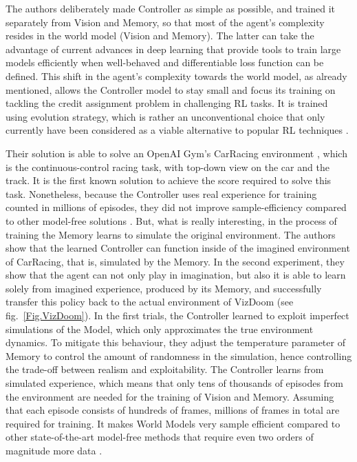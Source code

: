 The authors deliberately made Controller as simple as possible, and trained it separately from Vision and Memory, so that most of the agent's complexity resides in the world model (Vision and Memory). The latter can take the advantage of current advances in deep learning that provide tools to train large models efficiently when well-behaved and differentiable loss function can be defined.
This shift in the agent's complexity towards the world model, as already mentioned, allows the Controller model to stay small and focus its training on tackling the credit assignment problem in challenging RL tasks. It is trained using evolution strategy, which is rather an unconventional choice that only currently have been considered as a viable alternative to popular RL techniques \cite{Algo.ESRL}.

Their solution is able to solve an OpenAI Gym's CarRacing environment \cite{Code.OpenAIGym}, which is the continuous-control racing task, with top-down view on the car and the track. It is the first known solution to achieve the score required to solve this task. Nonetheless, because the Controller uses real experience for training counted in millions of episodes, they did not improve sample-efficiency compared to other model-free solutions \cite{Algo.CarRacingA3C}. But, what is really interesting, in the process of training the Memory learns to simulate the original environment. The authors show that the learned Controller can function inside of the imagined environment of CarRacing, that is, simulated by the Memory.
In the second experiment, they show that the agent can not only play in imagination, but also it is able to learn solely from imagined experience, produced by its Memory, and successfully transfer this policy back to the actual environment of VizDoom (see fig.~\ref{Fig.VizDoom}). In the first trials, the Controller learned to exploit imperfect simulations of the Model, which only approximates the true environment dynamics. To mitigate this behaviour, they adjust the temperature parameter of Memory to control the amount of randomness in the simulation, hence controlling the trade-off between realism and exploitability.
The Controller learns from simulated experience, which means that only tens of thousands of episodes from the environment are needed for the training of Vision and Memory. Assuming that each episode consists of hundreds of frames, millions of frames in total are required for training. It makes World Models very sample efficient compared to other state-of-the-art model-free methods that require even two orders of magnitude more data \cite{Algo.A3C}.

